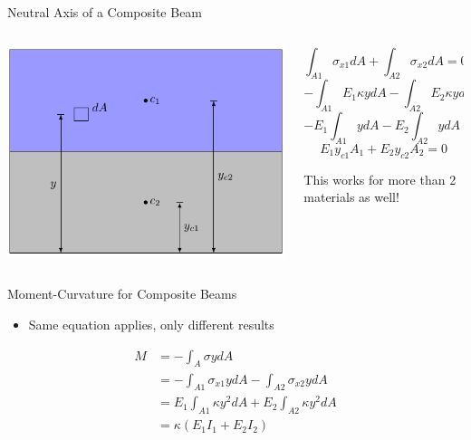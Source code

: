 \documentclass[10pt, svgnames]{beamer}
\begin{document}
\begin{frame}[label={sec:org0e9b76e}]{Neutral Axis of a Composite Beam}
\begin{columns}
\begin{column}{0.5\columnwidth}
\begin{center}
\includegraphics[width=.9\linewidth]{./pictures/na-composite.pdf}
\end{center}
\end{column}

\begin{column}{0.5\columnwidth}
\[\int_{A1} \sigma_{x1} dA + \int_{A2} \sigma_{x2} dA = 0\]
\[- \int_{A1} E_1 \kappa y dA - \int_{A2} E_2 \kappa y dA = 0\]
\[- E_1 \int_{A1} y dA - E_2 \int_{A2} y dA = 0\]
\[E_1 y_{c1} A_1 + E_2 y_{c2} A_2 = 0\]

This works for more than 2 materials as well!
\end{column}
\end{columns}
\end{frame}

\begin{frame}[label={sec:org6972fc6}]{Moment-Curvature for Composite Beams}
\begin{itemize}
\item Same equation applies, only different results
\end{itemize}

\begin{align*}
  M &= - \int_A \sigma y dA \\
    &= -\int_{A1} \sigma_{x1} y dA - \int_{A2} \sigma_{x2} y dA \\
    &= E_1 \int_{A1} \kappa y^2 dA + E_2 \int_{A2} \kappa y^2 dA \\
    &= \kappa \left( E_1 I_1 + E_2 I_2 \right)
\end{align*}
\end{frame}
\end{document}
